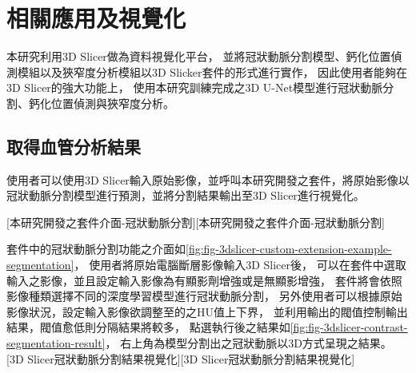 \documentclass[class=NCU_thesis, crop=false]{standalone}
\begin{document}
% 
% 
% 

\section{相關應用及視覺化}
本研究利用3D Slicer做為資料視覺化平台，
並將冠狀動脈分割模型、鈣化位置偵測模組以及狹窄度分析模組以3D Slicker套件的形式進行實作，
因此使用者能夠在3D Slicer的強大功能上，
使用本研究訓練完成之3D U-Net模型進行冠狀動脈分割、鈣化位置偵測與狹窄度分析。

\subsection{取得血管分析結果}
使用者可以使用3D Slicer輸入原始影像，並呼叫本研究開發之套件，將原始影像以冠狀動脈分割模型進行預測，並將分割結果輸出至3D Slicer進行視覺化。

[本研究開發之套件介面-冠狀動脈分割][本研究開發之套件介面-冠狀動脈分割]

套件中的冠狀動脈分割功能之介面如\cref{fig:fig-3dslicer-custom-extension-example-segmentation}，
使用者將原始電腦斷層影像輸入3D Slicer後，
可以在套件中選取輸入之影像，並且設定輸入影像為有顯影劑增強或是無顯影增強，
套件將會依照影像種類選擇不同的深度學習模型進行冠狀動脈分割，
另外使用者可以根據原始影像狀況，設定輸入影像欲調整至的之HU值上下界，
並利用輸出的閥值控制輸出結果，閥值愈低則分隔結果將較多，
點選執行後之結果如\cref{fig:fig-3dslicer-contrast-segmentation-result}，
右上角為模型分割出之冠狀動脈以3D方式呈現之結果。
[3D Slicer冠狀動脈分割結果視覺化][3D Slicer冠狀動脈分割結果視覺化]
\end{document}
